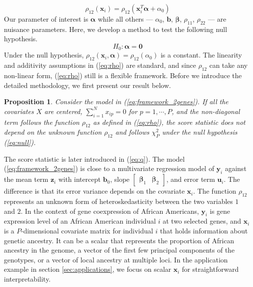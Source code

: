\documentclass[aap,authoryear, preprint]{imsart}
\numberwithin{equation}{section}
\theoremstyle{plain}
\newtheorem{prop}{Proposition}
\begin{document}
\begin{equation}
    \rho_{12}(\bm{x}_i) = \rho_{12}(\bm{x}_i^T\bm{\alpha} + \alpha_0) \label{eq:rho}
\end{equation}
Our parameter of interest is $\bm{\alpha}$ while all others --- $\alpha_0$, $\bm{b}$, $\bm{\beta}$, $\rho_{11}$, $\rho_{22}$ --- are nuisance parameters. Here, we develop a method to test the following null hypothesis.
\begin{equation}
    H_0: \bm{\alpha} = \bm{0}
    \label{eq:null}
\end{equation}
Under the null hypothesis, $\rho_{12}(\bm{x}_i, \bm{\alpha}) = \rho_{12}(\alpha_0)$ is a constant. The linearity and additivity assumptions in (\ref{eq:rho}) are standard, and since $\rho_{12}$ can take any non-linear form, (\ref{eq:rho}) still is a flexible framework. Before we introduce the detailed methodology, we first present our result below.

\begin{prop}
Consider the model in (\ref{eq:framework_2genes}). If all the covariates $X$ are centered, $\sum_{i=1}^{N} x_{ip} = 0$ for $p = 1, \cdots, P$, and the non-diagonal term follows the function $\rho_{12}$ as defined in (\ref{eq:rho}), the score statistic does not depend on the unknown function $\rho_{12}$ and follows $\chi_P^2$ under the null hypothesis (\ref{eq:null}). 
\label{theorem:q}
\end{prop}

The score statistic is later introduced in (\ref{eq:q}). The model (\ref{eq:framework_2genes}) is close to a multivariate regression model of $\bm{y}_i$ against the mean term $\bm{z}_i$ with intercept $\bm{b}_0$, slope $\begin{bmatrix} \bm{\beta}_1 & \bm{\beta}_2 \end{bmatrix}$, and error term $\bm{u}_i$. The difference is that its error variance depends on the covariate $\bm{x}_i$. The function $\rho_{12}$ represents an unknown form of heteroskedasticity between the two variables $1$ and $2$. In the context of gene coexpression of African Americans, $\bm{y}_i$ is gene expression level of an African American individual $i$ at two selected genes, and $\bm{x}_i$ is a $P$-dimensional covariate matrix for individual $i$ that holds information about genetic ancestry. It can be a scalar that represents the proportion of African ancestry in the genome, a vector of the first few principal components of the genotypes, or a vector of local ancestry at multiple loci. In the application example in section \ref{sec:applications}, we focus on scalar $\bm{x}_i$ for straightforward interpretability. \\
\end{document}

